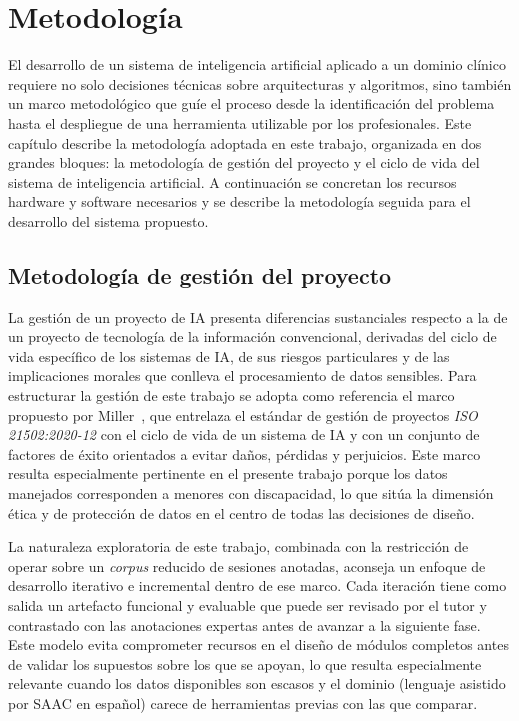 \chapter{Metodología}
\label{chap:metodologia}

El desarrollo de un sistema de inteligencia artificial aplicado a un dominio clínico
requiere no solo decisiones técnicas sobre arquitecturas y algoritmos, sino también
un marco metodológico que guíe el proceso desde la identificación del problema hasta
el despliegue de una herramienta utilizable por los profesionales. Este capítulo
describe la metodología adoptada en este trabajo, organizada en dos grandes bloques:
la metodología de gestión del proyecto y el ciclo de vida del sistema de inteligencia
artificial. A continuación se concretan los recursos hardware y software necesarios
y se describe la metodología seguida para el desarrollo del sistema propuesto.


\section{Metodología de gestión del proyecto}
\label{sec:metodologia_gestion}

La gestión de un proyecto de \ac{IA} presenta diferencias sustanciales respecto a la
de un proyecto de tecnología de la información convencional, derivadas del ciclo de
vida específico de los sistemas de \ac{IA}, de sus riesgos particulares y de las
implicaciones morales que conlleva el procesamiento de datos sensibles. Para
estructurar la gestión de este trabajo se adopta como referencia el marco propuesto por
Miller~\cite{miller2025framework}, que entrelaza el estándar de gestión de proyectos
\emph{ISO 21502:2020-12} con el ciclo de vida de un sistema de \ac{IA} y con un
conjunto de factores de éxito orientados a evitar daños, pérdidas y perjuicios. Este
marco resulta especialmente pertinente en el presente trabajo porque los datos
manejados corresponden a menores con discapacidad, lo que sitúa la dimensión ética y
de protección de datos en el centro de todas las decisiones de diseño.

La naturaleza exploratoria de este trabajo, combinada con la restricción de operar
sobre un \emph{corpus} reducido de sesiones anotadas, aconseja un enfoque de desarrollo
iterativo e incremental dentro de ese marco. Cada iteración tiene como salida un
artefacto funcional y evaluable que puede ser revisado por el tutor y contrastado con
las anotaciones expertas antes de avanzar a la siguiente fase. Este modelo evita
comprometer recursos en el diseño de módulos completos antes de validar los supuestos
sobre los que se apoyan, lo que resulta especialmente relevante cuando los datos
disponibles son escasos y el dominio (lenguaje asistido por \ac{SAAC} en español)
carece de herramientas previas con las que comparar.


